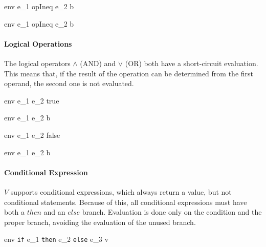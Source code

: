 \documentclass{article}
\begin{document}
\medskip

\medskip

    {\mbox{env} \vdash e_1 \; opIneq \; e_2 \Downarrow b}

    {\mbox{env} \vdash e_1 \; opIneq \; e_2 \Downarrow b}

\paragraph{Logical Operations}
The logical operators $\wedge$ (AND) and $\vee$ (OR) both have a short-circuit evaluation.
This means that, if the result of the operation can be determined from the first operand, the second one is not evaluated.

    {\mbox{env} \vdash e_1 \vee e_2 \Downarrow true}

    {\mbox{env} \vdash e_1 \vee e_2 \Downarrow b}

    {\mbox{env} \vdash e_1 \wedge e_2 \Downarrow false}

    {\mbox{env} \vdash e_1 \wedge e_2 \Downarrow b}

\paragraph{Conditional Expression}
$V$ supports conditional expressions, which always return a value, but not conditional statements.
Because of this, all conditional expressions must have both a $then$ and an $else$ branch.
Evaluation is done only on the condition and the proper branch, avoiding the evaluation of the unused branch.

    {\mbox{env} \vdash \texttt{if} \; e_1\; \texttt{then} \; e_2 \; \texttt{else} \; e_3 \Downarrow v}
\end{document}
